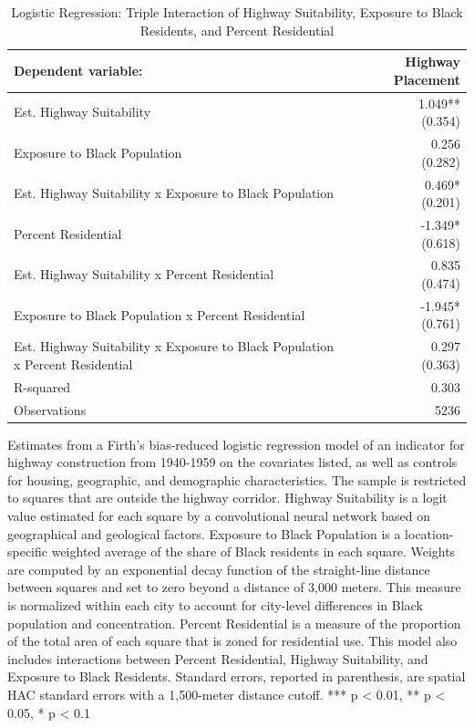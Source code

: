 \begin{table}[h]
\centering
\caption{Logistic Regression: Triple Interaction of Highway Suitability, Exposure to Black Residents, and Percent Residential}
\label{tab:results/suitabilityxblacksharexpctres}
\begin{threeparttable}
\begin{tabular*}{1.0\textwidth}{@{\extracolsep{\fill}}l*{1}{r}}
\toprule
Dependent variable: & Highway Placement \\
\midrule
Est. Highway Suitability & \makecell[tr]{1.049{**} \\ (0.354)} \\
Exposure to Black Population & \makecell[tr]{0.256 \\ (0.282)} \\
Est. Highway Suitability x Exposure to Black Population & \makecell[tr]{0.469{*} \\ (0.201)} \\
Percent Residential & \makecell[tr]{-1.349{*} \\ (0.618)} \\
Est. Highway Suitability x Percent Residential & \makecell[tr]{0.835 \\ (0.474)} \\
Exposure to Black Population x Percent Residential & \makecell[tr]{-1.945{*} \\ (0.761)} \\
Est. Highway Suitability x Exposure to Black Population x Percent Residential & \makecell[tr]{0.297 \\ (0.363)} \\
R-squared & 0.303 \\
Observations & 5236 \\
\bottomrule
\end{tabular*}
\begin{tablenotes}[flushleft]
\footnotesize
\item Estimates from a Firth's bias-reduced logistic regression model of an indicator for highway construction from 1940-1959 on the covariates listed, as well as controls for housing, geographic, and demographic characteristics. The sample is restricted to squares that are outside the highway corridor. Highway Suitability is a logit value estimated for each square by a convolutional neural network based on geographical and geological factors. Exposure to Black Population is a location-specific weighted average of the share of Black residents in each square. Weights are computed by an exponential decay function of the straight-line distance between squares and set to zero beyond a distance of 3,000 meters. This measure is normalized within each city to account for city-level differences in Black population and concentration. Percent Residential is a measure of the proportion of the total area of each square that is zoned for residential use. This model also includes interactions between Percent Residential, Highway Suitability, and Exposure to Black Residents. Standard errors, reported in parenthesis, are \textcite{conley_gmm_1999} spatial HAC standard errors with a 1,500-meter distance cutoff.  *** p < 0.01, ** p < 0.05, * p < 0.1
\end{tablenotes}
\end{threeparttable}
\end{table}
